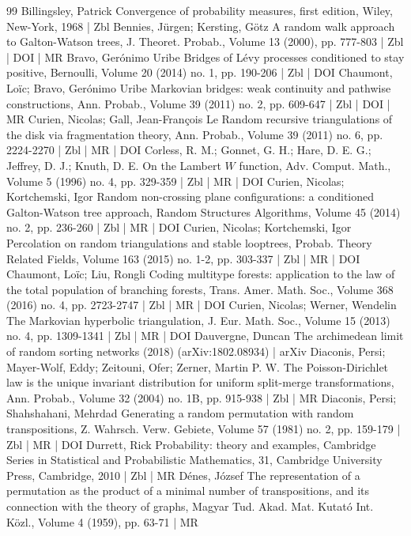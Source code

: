 \begin{thebibliography}{99}
Billingsley, Patrick Convergence of probability measures, first edition, Wiley, New-York, 1968 | Zbl
Bennies, Jürgen; Kersting, Götz A random walk approach to Galton-Watson trees, J. Theoret. Probab., Volume 13 (2000), pp. 777-803 | Zbl | DOI | MR
Bravo, Gerónimo Uribe Bridges of Lévy processes conditioned to stay positive, Bernoulli, Volume 20 (2014) no. 1, pp. 190-206 | Zbl | DOI
Chaumont, Loïc; Bravo, Gerónimo Uribe Markovian bridges: weak continuity and pathwise constructions, Ann. Probab., Volume 39 (2011) no. 2, pp. 609-647 | Zbl | DOI | MR
Curien, Nicolas; Gall, Jean-François Le Random recursive triangulations of the disk via fragmentation theory, Ann. Probab., Volume 39 (2011) no. 6, pp. 2224-2270 | Zbl | MR | DOI
Corless, R. M.; Gonnet, G. H.; Hare, D. E. G.; Jeffrey, D. J.; Knuth, D. E. On the Lambert $W$ function, Adv. Comput. Math., Volume 5 (1996) no. 4, pp. 329-359 | Zbl | MR | DOI
Curien, Nicolas; Kortchemski, Igor Random non-crossing plane configurations: a conditioned Galton-Watson tree approach, Random Structures Algorithms, Volume 45 (2014) no. 2, pp. 236-260 | Zbl | MR | DOI
Curien, Nicolas; Kortchemski, Igor Percolation on random triangulations and stable looptrees, Probab. Theory Related Fields, Volume 163 (2015) no. 1-2, pp. 303-337 | Zbl | MR | DOI
Chaumont, Loïc; Liu, Rongli Coding multitype forests: application to the law of the total population of branching forests, Trans. Amer. Math. Soc., Volume 368 (2016) no. 4, pp. 2723-2747 | Zbl | MR | DOI
Curien, Nicolas; Werner, Wendelin The Markovian hyperbolic triangulation, J. Eur. Math. Soc., Volume 15 (2013) no. 4, pp. 1309-1341 | Zbl | MR | DOI
Dauvergne, Duncan The archimedean limit of random sorting networks (2018) (arXiv:1802.08934) | arXiv
Diaconis, Persi; Mayer-Wolf, Eddy; Zeitouni, Ofer; Zerner, Martin P. W. The Poisson-Dirichlet law is the unique invariant distribution for uniform split-merge transformations, Ann. Probab., Volume 32 (2004) no. 1B, pp. 915-938 | Zbl | MR
Diaconis, Persi; Shahshahani, Mehrdad Generating a random permutation with random transpositions, Z. Wahrsch. Verw. Gebiete, Volume 57 (1981) no. 2, pp. 159-179 | Zbl | MR | DOI
Durrett, Rick Probability: theory and examples, Cambridge Series in Statistical and Probabilistic Mathematics, 31, Cambridge University Press, Cambridge, 2010 | Zbl | MR
Dénes, József The representation of a permutation as the product of a minimal number of transpositions, and its connection with the theory of graphs, Magyar Tud. Akad. Mat. Kutató Int. Közl., Volume 4 (1959), pp. 63-71 | MR

\end{thebibliography}
